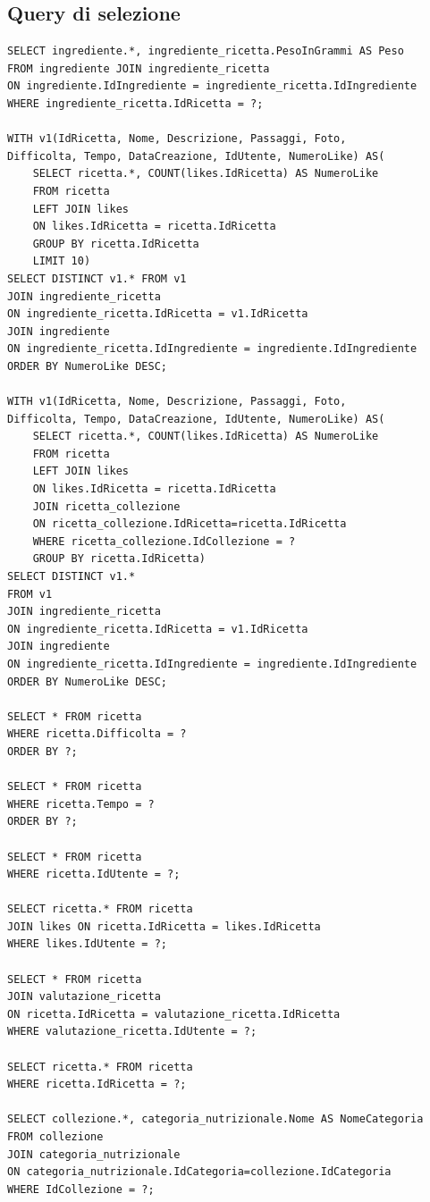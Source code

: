 ﻿\documentclass[a4paper,12pt]{report}
\begin{document}
\subsection{Query di selezione}
\begin{verbatim}
SELECT ingrediente.*, ingrediente_ricetta.PesoInGrammi AS Peso
FROM ingrediente JOIN ingrediente_ricetta
ON ingrediente.IdIngrediente = ingrediente_ricetta.IdIngrediente
WHERE ingrediente_ricetta.IdRicetta = ?;

WITH v1(IdRicetta, Nome, Descrizione, Passaggi, Foto,
Difficolta, Tempo, DataCreazione, IdUtente, NumeroLike) AS(
    SELECT ricetta.*, COUNT(likes.IdRicetta) AS NumeroLike
    FROM ricetta
    LEFT JOIN likes
    ON likes.IdRicetta = ricetta.IdRicetta
    GROUP BY ricetta.IdRicetta
    LIMIT 10)
SELECT DISTINCT v1.* FROM v1
JOIN ingrediente_ricetta
ON ingrediente_ricetta.IdRicetta = v1.IdRicetta
JOIN ingrediente
ON ingrediente_ricetta.IdIngrediente = ingrediente.IdIngrediente
ORDER BY NumeroLike DESC;

WITH v1(IdRicetta, Nome, Descrizione, Passaggi, Foto,
Difficolta, Tempo, DataCreazione, IdUtente, NumeroLike) AS(
    SELECT ricetta.*, COUNT(likes.IdRicetta) AS NumeroLike
    FROM ricetta
    LEFT JOIN likes
    ON likes.IdRicetta = ricetta.IdRicetta
    JOIN ricetta_collezione
    ON ricetta_collezione.IdRicetta=ricetta.IdRicetta
    WHERE ricetta_collezione.IdCollezione = ?
    GROUP BY ricetta.IdRicetta)
SELECT DISTINCT v1.*
FROM v1
JOIN ingrediente_ricetta
ON ingrediente_ricetta.IdRicetta = v1.IdRicetta
JOIN ingrediente
ON ingrediente_ricetta.IdIngrediente = ingrediente.IdIngrediente
ORDER BY NumeroLike DESC;

SELECT * FROM ricetta
WHERE ricetta.Difficolta = ?
ORDER BY ?;

SELECT * FROM ricetta
WHERE ricetta.Tempo = ?
ORDER BY ?;

SELECT * FROM ricetta
WHERE ricetta.IdUtente = ?;

SELECT ricetta.* FROM ricetta
JOIN likes ON ricetta.IdRicetta = likes.IdRicetta
WHERE likes.IdUtente = ?;

SELECT * FROM ricetta
JOIN valutazione_ricetta
ON ricetta.IdRicetta = valutazione_ricetta.IdRicetta
WHERE valutazione_ricetta.IdUtente = ?;

SELECT ricetta.* FROM ricetta
WHERE ricetta.IdRicetta = ?;

SELECT collezione.*, categoria_nutrizionale.Nome AS NomeCategoria
FROM collezione
JOIN categoria_nutrizionale
ON categoria_nutrizionale.IdCategoria=collezione.IdCategoria
WHERE IdCollezione = ?;


\end{verbatim}
\end{document}
